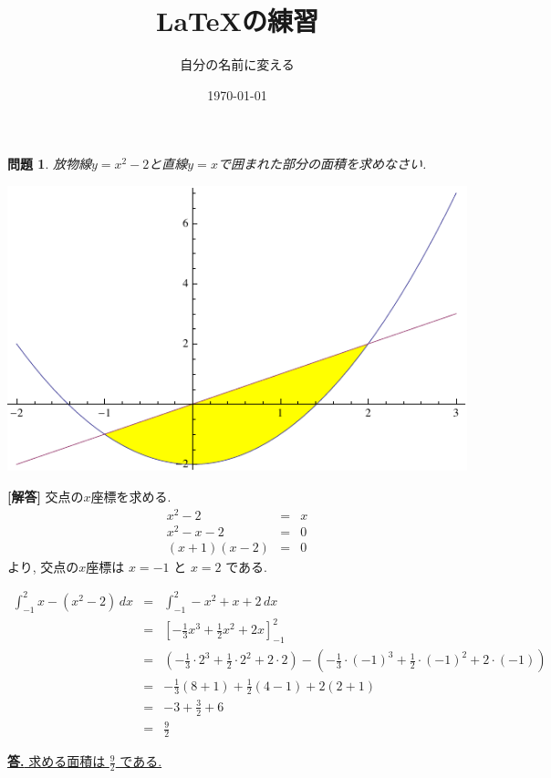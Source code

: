 \documentclass[dvipdfmx]{jarticle}
\title{LaTeXの練習}
\author{自分の名前に変える}
\date{\today}
\newtheorem{problem}{{\bf 問題}}
\begin{document}
\maketitle

\begin{problem}
放物線$y=x^2-2$と直線$y=x$で囲まれた部分の面積を求めなさい.
 \begin{center}
 \includegraphics[scale=0.5]{fig1.pdf}
 \end{center}
\end{problem}

\noindent
{\bf [解答]} 交点の$x$座標を求める.
\begin{eqnarray*}
x^2-2 &=& x \\
x^2-x-2 &=& 0 \\
(x+1)(x-2)&=& 0
\end{eqnarray*}
より, 交点の$x$座標は $x=-1$ と $x=2$ である.

\begin{eqnarray*}
\int_{-1}^{2} x-(x^2 -2) \, dx &=& 
\int_{-1}^{2} -x^2 + x +2 \, dx \\
&=& \left[ -\frac{1}{3} x^3 + \frac{1}{2} x^2 + 2x \right]_{-1}^{2} \\
&=& (-\frac{1}{3} \cdot 2^3 + \frac{1}{2} \cdot 2^2 +2 \cdot 2 )
- (-\frac{1}{3} \cdot (-1)^3+\frac{1}{2} \cdot (-1)^2 +2 \cdot(-1)) \\
&=& -\frac{1}{3}(8+1) +\frac{1}{2}(4-1) +2(2+1) \\
&=& -3 + \frac{3}{2} + 6 \\
&=& \frac{9}{2}
\end{eqnarray*}

\begin{flushright}
\underline{{\bf 答.} 求める面積は $\displaystyle \frac{9}{2}$ である.}
\end{flushright}
\end{document}
